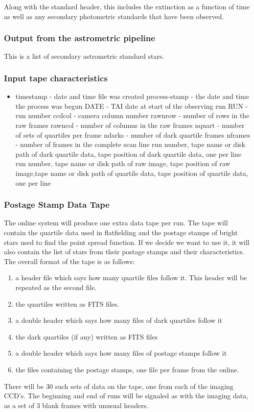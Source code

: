Along with the standard header, this includes the extinction as a function
of time as well as any secondary photometric standards that have been
observed.

\subsubsection{Output from the astrometric pipeline}

This is a list of secondary astrometric standard stars.

\subsubsection{Input tape characteristics} 
\begin{itemize}
\item timestamp - date and time file was created
\sitem process-stamp - the date and time the process was begun
\sitem DATE - TAI date at start of the observing run
\sitem RUN - run number
\sitem ccdcol - camera column number
\sitem rawnrow - number of rows in the raw frames
\sitem rawncol - number of columns in the raw frames
\sitem nquart - number of sets of quartiles per frame
\sitem ndarks - number of dark quartile frames
\sitem nframes - number of frames in the complete scan line
\sitem run number, tape name or disk path of dark quartile  data, tape
 position of dark quartile data, one per line
\sitem run number, tape name or disk path of raw image, tape position of
 raw image,tape name or disk path of quartile data, tape position of
 quartile data, one per line
\end{itemize}

\subsubsection{Postage Stamp Data Tape}

	The online system will produce one extra data tape per run.  The
tape will contain the quartile data used in flatfielding and the postage
stamps of bright stars used to find the point spread function.  If we
decide we want to use it, it will also contain the list of stars from their
postage stamps and their characteristics.  The overall
format of the tape is as follows:
\begin{enumerate}
\item a header file which says how many quartile files follow it.  This 
header will be repeated as the second file.
\item the quartiles written as FITS files.
\item a double header which says how many files of dark quartiles follow it
\item the dark quartiles (if any) written as FITS files
\item a double header which says how many files of postage stamps follow it 
\item the files containing the postage stamps, one file per frame from the online.
\end{enumerate}
There will be 30 such sets of data on the tape, one from each
of the imaging CCD's.  The beginning and end of runs will be signaled
as with the imaging data, as a set of 3 blank frames with unusual headers.

